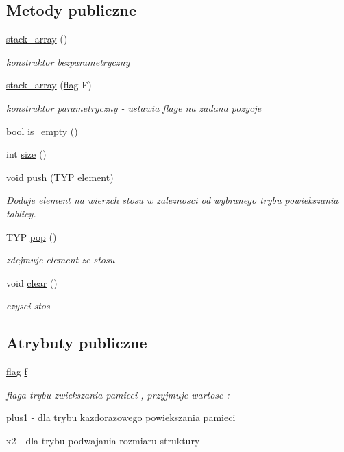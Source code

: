 \subsection*{Metody publiczne}
\begin{DoxyCompactItemize}
\item 
\hyperlink{classstack__array_a430ec07ba59152bdb618039ae5f74482}{stack\-\_\-array} ()
\begin{DoxyCompactList}\small\item\em konstruktor bezparametryczny \end{DoxyCompactList}\item 
\hyperlink{classstack__array_ad6ac30696a594fc1f4b58cc94facad9f}{stack\-\_\-array} (\hyperlink{stos_8hh_a7847560c748814fd3070e9149a9578bd}{flag} F)
\begin{DoxyCompactList}\small\item\em konstruktor parametryczny -\/ ustawia flage na zadana pozycje \end{DoxyCompactList}\item 
bool \hyperlink{classstack__array_a653b67eb0566e9481e3525dd2f2bc519}{is\-\_\-empty} ()
\item 
int \hyperlink{classstack__array_a26ee4c653f299d3fe03b443f6180d745}{size} ()
\item 
void \hyperlink{classstack__array_ac0d13dd3989ad8dd6689795acc3352cf}{push} (T\-Y\-P element)
\begin{DoxyCompactList}\small\item\em Dodaje element na wierzch stosu w zaleznosci od wybranego trybu powiekszania tablicy. \end{DoxyCompactList}\item 
T\-Y\-P \hyperlink{classstack__array_ad2ce52b1a99f72d383b429dff262b9eb}{pop} ()
\begin{DoxyCompactList}\small\item\em zdejmuje element ze stosu \end{DoxyCompactList}\item 
void \hyperlink{classstack__array_ac55f6fe35d44781d918884e4c466d3ee}{clear} ()
\begin{DoxyCompactList}\small\item\em czysci stos \end{DoxyCompactList}\end{DoxyCompactItemize}
\subsection*{Atrybuty publiczne}
\begin{DoxyCompactItemize}
\item 
\hyperlink{stos_8hh_a7847560c748814fd3070e9149a9578bd}{flag} \hyperlink{classstack__array_a06357855e64616369e11f330191413ee}{f}
\begin{DoxyCompactList}\small\item\em flaga trybu zwiekszania pamieci , przyjmuje wartosc \-: \par
plus1 -\/ dla trybu kazdorazowego powiekszania pamieci \par
x2 -\/ dla trybu podwajania rozmiaru struktury \end{DoxyCompactList}\end{DoxyCompactItemize}
